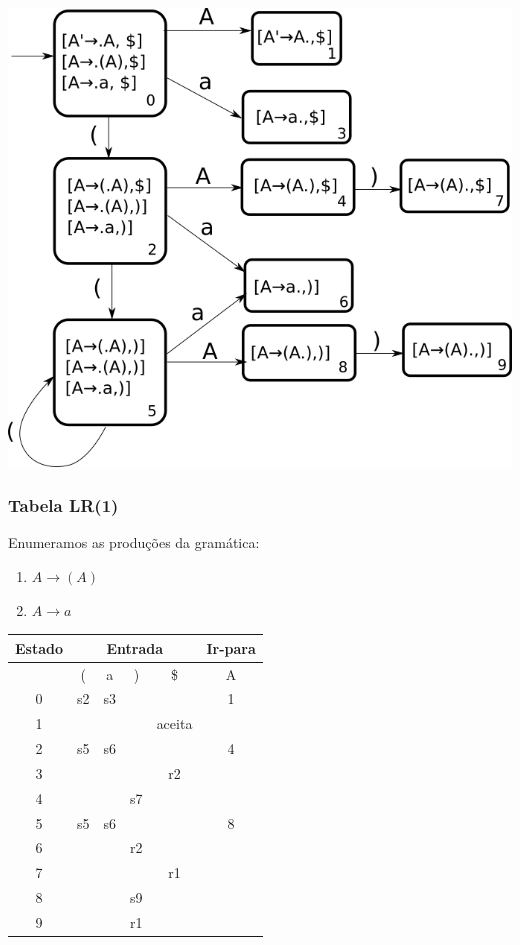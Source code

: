 \documentclass[table]{beamer}
\begin{document}
\begin{frame}
   \includegraphics[width=\linewidth,height=\textheight,keepaspectratio]{figuras/aadfalr1.png}
\end{frame}

\begin{frame}
   \frametitle{Tabela LR(1)}
   Enumeramos as produções da gramática:
   \begin{enumerate}
      \item $A\to(A)$
      \item $A\to a$
   \end{enumerate}
   \begin{table}
      \begin{tabular}{|c|c|c|c|c|c|}
      \hline
      \textbf{Estado} & \multicolumn{4}{c|}{\textbf{Entrada}} & \textbf{Ir-para} \\
      \hline 
         & (  & a  & )  & \$     & A  \\
       \hline
       0 & s2 & s3 &    &        & 1  \\
       1 &    &    &    & aceita &    \\
       2 & s5 & s6 &    &        & 4  \\
       3 &    &    &    & r2     &    \\
       4 &    &    & s7 &        &    \\
       5 & s5 & s6 &    &        & 8  \\
       6 &    &    & r2 &        &    \\
       7 &    &    &    & r1     &    \\
       8 &    &    & s9 &        &    \\
       9 &    &    & r1 &        &    \\
      \hline
      \end{tabular}
   \end{table}
\end{frame}
\end{document}
